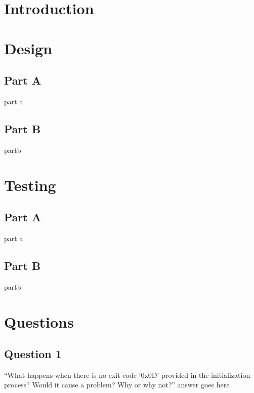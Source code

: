 \documentclass[letterpaper]{article}
\begin{document}
  \begin{titlepage}
    \begin{center}
    \end{center}
\end{titlepage}

\tableofcontents
\newpage

\section{Introduction}

\section{Design}

  \subsection{Part A}
    part a

  \subsection{Part B}
    partb


\section{Testing}
  \subsection{Part A}
    part a

  \subsection{Part B}
    partb

\section{Questions}

    \subsection{Question 1}
      \item ``What happens when there is no exit code ‘0x0D’ provided in the initialization process? Would it cause a problem? Why or why not?''
      answer goes here
\end{document}
